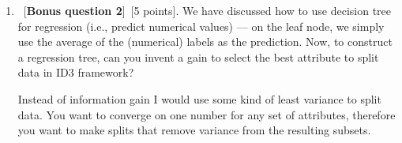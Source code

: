 \documentclass[12pt, fullpage,letterpaper]{article}
\begin{document}
\begin{enumerate}
\begin{framed}
\end{framed}

\item ~[\textbf{Bonus question 2}]~[5 points].  We have discussed how to use decision tree for regression (i.e., predict numerical values) --- on the leaf node, we simply use the average of the (numerical) labels as the prediction.  Now, to construct a regression tree, can you invent a gain to select the best attribute to split data in ID3 framework?

\begin{framed}
	  \newline
	Instead of information gain I would use some kind of least variance to split data. You want to converge on one number for any set of attributes, therefore you want to make splits that remove variance from the resulting subsets. 
	
\end{framed}

\end{enumerate}
\end{document}
